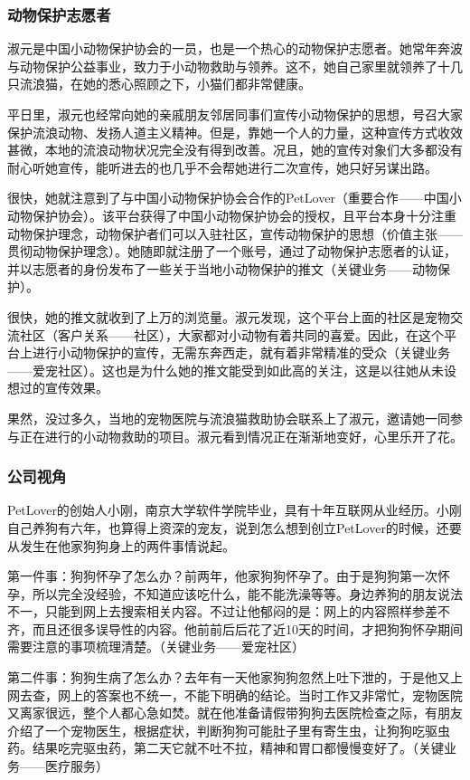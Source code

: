 \documentclass[a4paper]{ctexart}
\begin{document}
\subsubsection{动物保护志愿者}
淑元是中国小动物保护协会的一员，也是一个热心的动物保护志愿者。她常年奔波与动物保护公益事业，致力于小动物救助与领养。这不，她自己家里就领养了十几只流浪猫，在她的悉心照顾之下，小猫们都非常健康。

平日里，淑元也经常向她的亲戚朋友邻居同事们宣传小动物保护的思想，号召大家保护流浪动物、发扬人道主义精神。但是，靠她一个人的力量，这种宣传方式收效甚微，本地的流浪动物状况完全没有得到改善。况且，她的宣传对象们大多都没有耐心听她宣传，能听进去的也几乎不会帮她进行二次宣传，她只好另谋出路。

很快，她就注意到了与中国小动物保护协会合作的PetLover（重要合作——中国小动物保护协会）。该平台获得了中国小动物保护协会的授权，且平台本身十分注重动物保护理念，动物保护者们可以入驻社区，宣传动物保护的思想（价值主张——贯彻动物保护理念）。她随即就注册了一个账号，通过了动物保护志愿者的认证，并以志愿者的身份发布了一些关于当地小动物保护的推文（关键业务——动物保护）。

很快，她的推文就收到了上万的浏览量。淑元发现，这个平台上面的社区是宠物交流社区（客户关系——社区），大家都对小动物有着共同的喜爱。因此，在这个平台上进行小动物保护的宣传，无需东奔西走，就有着非常精准的受众（关键业务——爱宠社区）。这也是为什么她的推文能受到如此高的关注，这是以往她从未设想过的宣传效果。

果然，没过多久，当地的宠物医院与流浪猫救助协会联系上了淑元，邀请她一同参与正在进行的小动物救助的项目。淑元看到情况正在渐渐地变好，心里乐开了花。

\subsubsection{公司视角}
PetLover的创始人小刚，南京大学软件学院毕业，具有十年互联网从业经历。小刚自己养狗有六年，也算得上资深的宠友，说到怎么想到创立PetLover的时候，还要从发生在他家狗狗身上的两件事情说起。

第一件事：狗狗怀孕了怎么办？前两年，他家狗狗怀孕了。由于是狗狗第一次怀孕，所以完全没经验，不知道应该吃什么，能不能洗澡等等。身边养狗的朋友说法不一，只能到网上去搜索相关内容。不过让他郁闷的是：网上的内容照样参差不齐，而且还很多误导性的内容。他前前后后花了近10天的时间，才把狗狗怀孕期间需要注意的事项梳理清楚。（关键业务——爱宠社区）

第二件事：狗狗生病了怎么办？去年有一天他家狗狗忽然上吐下泄的，于是他又上网去查，网上的答案也不统一，不能下明确的结论。当时工作又非常忙，宠物医院又离家很远，整个人都心急如焚。就在他准备请假带狗狗去医院检查之际，有朋友介绍了一个宠物医生，根据症状，判断狗狗可能肚子里有寄生虫，让狗狗吃驱虫药。结果吃完驱虫药，第二天它就不吐不拉，精神和胃口都慢慢变好了。（关键业务——医疗服务）
\end{document}
